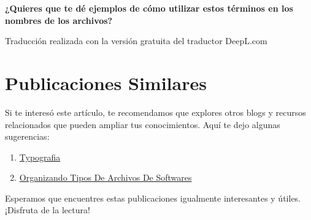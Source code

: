 \documentclass[
  stu,
  floatsintext,
  longtable,
  a4paper,
  nolmodern,
  notxfonts,
  notimes,
  12pt,
  colorlinks=true,linkcolor=blue,citecolor=blue,urlcolor=blue]{apa7}
\providecommand{\tightlist}{%
  \setlength{\itemsep}{0pt}\setlength{\parskip}{0pt}}
\begin{document}
\textbf{¿Quieres que te dé ejemplos de cómo utilizar estos términos en
los nombres de los archivos?}

Traducción realizada con la versión gratuita del traductor DeepL.com

\section{Publicaciones Similares}\label{publicaciones-similares}

Si te interesó este artículo, te recomendamos que explores otros blogs y
recursos relacionados que pueden ampliar tus conocimientos. Aquí te dejo
algunas sugerencias:

\begin{enumerate}
\def\labelenumi{\arabic{enumi}.}
\tightlist
\item
  \href{https://numerus-scriptum.netlify.app/fundamentos-programacion/2018-06-09-typografia/index.pdf}{}
  \href{https://numerus-scriptum.netlify.app/fundamentos-programacion/2018-06-09-typografia}{Typografia}
\item
  \href{https://numerus-scriptum.netlify.app/fundamentos-programacion/2019-08-13-organizando-tipos-de-archivos-de-softwares/index.pdf}{}
  \href{https://numerus-scriptum.netlify.app/fundamentos-programacion/2019-08-13-organizando-tipos-de-archivos-de-softwares}{Organizando
  Tipos De Archivos De Softwares}
\end{enumerate}

Esperamos que encuentres estas publicaciones igualmente interesantes y
útiles. ¡Disfruta de la lectura!
\end{document}
